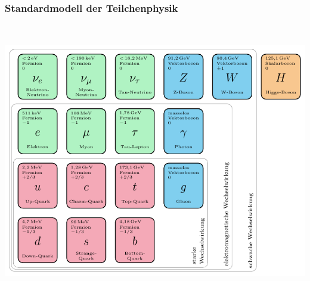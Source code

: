 \documentclass[10pt,t]{beamer}
\begin{document}
\begin{frame}\centering
\frametitle{Standardmodell der Teilchenphysik}
\vspace*{-2.5\baselineskip}
\begin{columns}
~\\[-\baselineskip]
    \includegraphics[width=\textwidth]{standardmodell-de}
~\\[4cm]
     \\[0.5cm]
\end{columns}
\vspace*{-5pt}
\end{frame}
\end{document}
